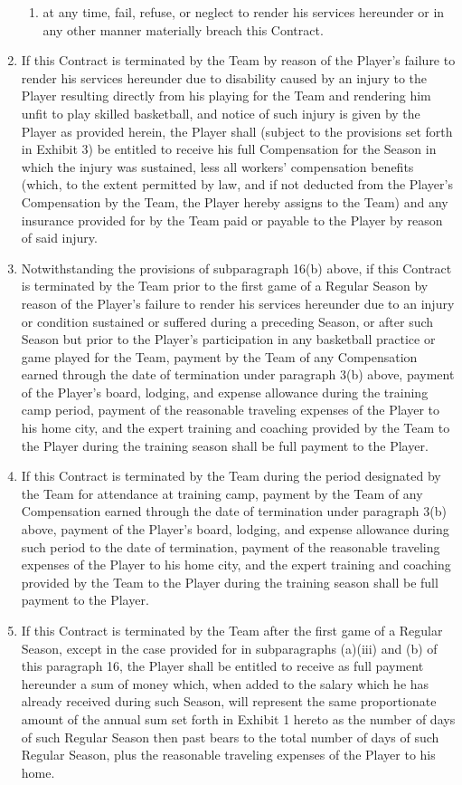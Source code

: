 \documentclass[
]{book}
\begin{document}
\begin{enumerate}
\begin{enumerate}
  \item
    at any time, fail, refuse, or neglect to render his services hereunder or in any other manner materially breach this Contract.
  \end{enumerate}
\item
  If this Contract is terminated by the Team by reason of the Player's failure to render his services hereunder due to disability caused by an injury to the Player resulting directly from his playing for the Team and rendering him unfit to play skilled basketball, and notice of such injury is given by the Player as provided herein, the Player shall (subject to the provisions set forth in Exhibit 3) be entitled to receive his full Compensation for the Season in which the injury was sustained, less all workers' compensation benefits (which, to the extent permitted by law, and if not deducted from the Player's Compensation by the Team, the Player hereby assigns to the Team) and any insurance provided for by the Team paid or payable to the Player by reason of said injury.
\item
  Notwithstanding the provisions of subparagraph 16(b) above, if this Contract is terminated by the Team prior to the first game of a Regular Season by reason of the Player's failure to render his services hereunder due to an injury or condition sustained or suffered during a preceding Season, or after such Season but prior to the Player's participation in any basketball practice or game played for the Team, payment by the Team of any Compensation earned through the date of termination under paragraph 3(b) above, payment of the Player's board, lodging, and expense allowance during the training camp period, payment of the reasonable traveling expenses of the Player to his home city, and the expert training and coaching provided by the Team to the Player during the training season shall be full payment to the Player.
\item
  If this Contract is terminated by the Team during the period designated by the Team for attendance at training camp, payment by the Team of any Compensation earned through the date of termination under paragraph 3(b) above, payment of the Player's board, lodging, and expense allowance during such period to the date of termination, payment of the reasonable traveling expenses of the Player to his home city, and the expert training and coaching provided by the Team to the Player during the training season shall be full payment to the Player.
\item
  If this Contract is terminated by the Team after the first game of a Regular Season, except in the case provided for in subparagraphs (a)(iii) and (b) of this paragraph 16, the Player shall be entitled to receive as full payment hereunder a sum of money which, when added to the salary which he has already received during such Season, will represent the same proportionate amount of the annual sum set forth in Exhibit 1 hereto as the number of days of such Regular Season then past bears to the total number of days of such Regular Season, plus the reasonable traveling expenses of the Player to his home.

\end{enumerate}
\end{document}
